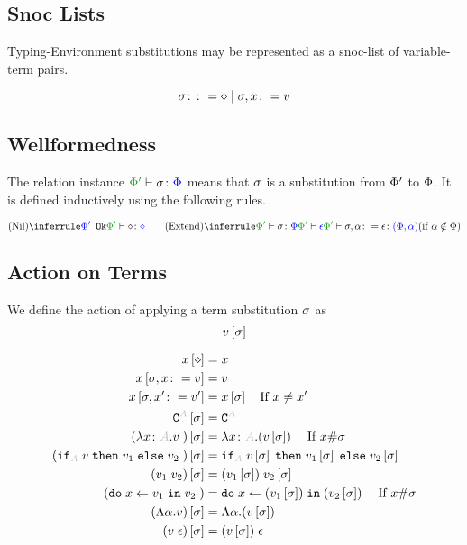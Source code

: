 \documentclass{report}
\begin{document}
    \subsection{Snoc Lists}
        Typing-Environment substitutions may be represented as a snoc-list of variable-term pairs.

        \[
            \si \gens \nil \mid \si, x \setto v
        \]

    \subsection{Wellformedness}
    The relation instance $\typerelation{\P'}{\si}{\P}$ means that $\si$ is a substitution from $\P'$ to $\P$. It is defined inductively using the following rules.

    \[
        \ntreeruleI{Nil}{\ok{\P'}}{\typerelation{\P'}{\nil}{\nil}}
        \quad\quad
        \condtreeruleII{Extend}{\typerelation{\P'}{\si}{\P}}{\wellformed{\P'}{\e}}{\typerelation{\P'}{\si, \a \setto\e}{(\P, \a)}}{\a\notin\P}
    \]

    \subsection{Action on Terms}
         We define the action of applying a term substitution $\si$ as 
         $$v\ssi$$
         
         
         \begin{align*}
             x\sub{\nil} & = x \\
             x\sub{\si,x\setto v} & = v \\
             x\sub{\si,x'\setto v'} & = x\ssi\qt{If }x \neq x'\\
             \const{A}\ssi & = \const{A} \\
             (\lam{x}{A}{v})\ssi &= \lam{x}{A}{(v\ssi)}\qt{If }x\#\si\\
             (\pifthenelse{A}{v}{v_1}{v_2})\ssi &= \pifthenelse{A}{v\ssi}{v_1\ssi}{v_2\ssi}\\
             (\apply{v_1}{v_2})\ssi&= \apply{(v_1\ssi)}{v_2\ssi}\\
             (\doin{x}{v_1}{v_2})&= \doin{x}{(v_1\ssi)}{(v_2\ssi)}\qt{If } x\#\si\\
             (\elam{\a}{v})\ssi & = \elam{\a}{(v\ssi)}\\
             (\eapp{v}{\e})\ssi & = \eapp{(v\ssi)}{\e}\\
         \end{align*}    
\end{document}
